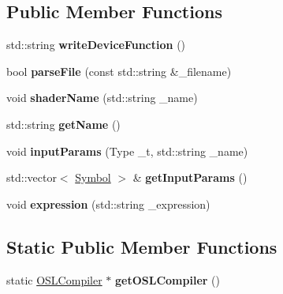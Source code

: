 \subsection*{Public Member Functions}
\begin{DoxyCompactItemize}
\item 
\hypertarget{class_o_s_l_compiler_a27250baf443ec1b9b95a43fb570db1ad}{std\-::string {\bfseries write\-Device\-Function} ()}\label{class_o_s_l_compiler_a27250baf443ec1b9b95a43fb570db1ad}

\item 
\hypertarget{class_o_s_l_compiler_a1b50472bf1356bdde412a6aa526e0853}{bool {\bfseries parse\-File} (const std\-::string \&\-\_\-filename)}\label{class_o_s_l_compiler_a1b50472bf1356bdde412a6aa526e0853}

\item 
\hypertarget{class_o_s_l_compiler_a8f196d28d8d12777afc162527954dd09}{void {\bfseries shader\-Name} (std\-::string \-\_\-name)}\label{class_o_s_l_compiler_a8f196d28d8d12777afc162527954dd09}

\item 
\hypertarget{class_o_s_l_compiler_ac4b95c72b012392fc1a2fa0eb2f65a87}{std\-::string {\bfseries get\-Name} ()}\label{class_o_s_l_compiler_ac4b95c72b012392fc1a2fa0eb2f65a87}

\item 
\hypertarget{class_o_s_l_compiler_a3164ffb12e88f3b706bdac3482903ee5}{void {\bfseries input\-Params} (Type \-\_\-t, std\-::string \-\_\-name)}\label{class_o_s_l_compiler_a3164ffb12e88f3b706bdac3482903ee5}

\item 
\hypertarget{class_o_s_l_compiler_a8be80d40096d7d8679b0e0310000fb8b}{std\-::vector$<$ \hyperlink{struct_o_s_l_compiler_1_1_symbol}{Symbol} $>$ \& {\bfseries get\-Input\-Params} ()}\label{class_o_s_l_compiler_a8be80d40096d7d8679b0e0310000fb8b}

\item 
\hypertarget{class_o_s_l_compiler_ac507469fa9322f917741cc291728ae41}{void {\bfseries expression} (std\-::string \-\_\-expression)}\label{class_o_s_l_compiler_ac507469fa9322f917741cc291728ae41}

\end{DoxyCompactItemize}
\subsection*{Static Public Member Functions}
\begin{DoxyCompactItemize}
\item 
\hypertarget{class_o_s_l_compiler_a7389b88db7bf82c38b02c597e2986410}{static \hyperlink{class_o_s_l_compiler}{O\-S\-L\-Compiler} $\ast$ {\bfseries get\-O\-S\-L\-Compiler} ()}\label{class_o_s_l_compiler_a7389b88db7bf82c38b02c597e2986410}

\end{DoxyCompactItemize}

